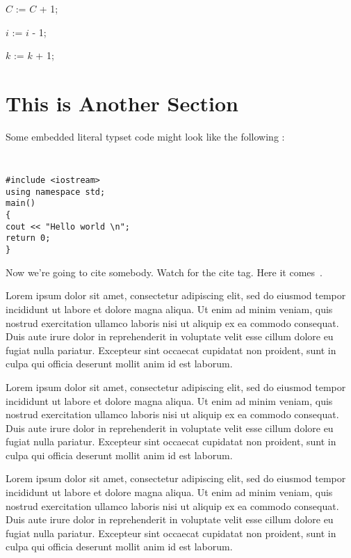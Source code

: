 \documentclass[letterpaper,twocolumn,10pt]{article}
\begin{document}
\begin{algorithm}[t!]
{{{{{{                          }

			$C$ := $C$ + 1; \textcolor{ForestGreen}{\textbf{\selectfont{// increase not in-place quick fix locations counter}}}\
	         }
		 $i$ := $i$ - 1; \textcolor{ForestGreen}{\textbf{\selectfont{// go one step backwards on the path}}}\
		}
	      }
	$k$ := $k$ + 1; \textcolor{ForestGreen}{\textbf{\selectfont{// get next satisfiable program execution path}}}\ \\
     }
  }
\end{algorithm}


\section{This is Another Section}

Some embedded literal typset code might 
look like the following :

{\tt \small
\begin{verbatim}
#include <iostream>
using namespace std;
main()
{
cout << "Hello world \n";
return 0;
}

\end{verbatim}
}

Now we're going to cite somebody.  Watch for the cite tag.
Here it comes~\cite{Einstein}.  

Lorem ipsum dolor sit amet, consectetur adipiscing elit, sed do eiusmod tempor incididunt ut labore et dolore magna aliqua. Ut enim ad minim veniam, quis nostrud exercitation ullamco laboris nisi ut aliquip ex ea commodo consequat. Duis aute irure dolor in reprehenderit in voluptate velit esse cillum dolore eu fugiat nulla pariatur. Excepteur sint occaecat cupidatat non proident, sunt in culpa qui officia deserunt mollit anim id est laborum.

Lorem ipsum dolor sit amet, consectetur adipiscing elit, sed do eiusmod tempor incididunt ut labore et dolore magna aliqua. Ut enim ad minim veniam, quis nostrud exercitation ullamco laboris nisi ut aliquip ex ea commodo consequat. Duis aute irure dolor in reprehenderit in voluptate velit esse cillum dolore eu fugiat nulla pariatur. Excepteur sint occaecat cupidatat non proident, sunt in culpa qui officia deserunt mollit anim id est laborum.

Lorem ipsum dolor sit amet, consectetur adipiscing elit, sed do eiusmod tempor incididunt ut labore et dolore magna aliqua. Ut enim ad minim veniam, quis nostrud exercitation ullamco laboris nisi ut aliquip ex ea commodo consequat. Duis aute irure dolor in reprehenderit in voluptate velit esse cillum dolore eu fugiat nulla pariatur. Excepteur sint occaecat cupidatat non proident, sunt in culpa qui officia deserunt mollit anim id est laborum.
\end{document}

